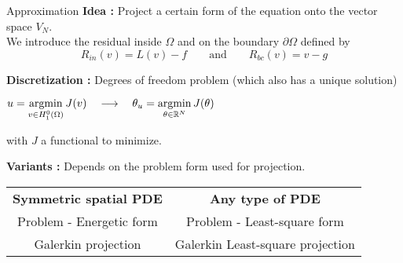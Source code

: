 \begin{frame}{Approximation}
	\textbf{Idea :} Project a certain form of the equation onto the vector space $V_N$. \\
	We introduce the residual inside $\Omega$ and on the boundary $\partial\Omega$ defined by
	\begin{equation*}
		R_{in}(v)=L(v) - f \qquad \text{and} \qquad R_{bc}(v)=v-g
	\end{equation*}
	
	\vspace{5pt}
	
	\textbf{Discretization :} Degrees of freedom problem (which also has a unique solution)
	\begin{center}
		$\displaystyle u=\operatorname*{argmin}_{v\in H_1^0(\Omega)} J(v) \quad \longrightarrow \quad \theta_u=\operatorname*{argmin}_{\theta\in \mathbb{R}^N} J(\theta) $
	\end{center}
	with $J$ a functional to minimize.
	
	\vspace{5pt}
	
	\textbf{Variants :} Depends on the problem form used for projection.
	
	\begin{center}
		\begin{tabular}{c|c}
			\textbf{Symmetric spatial PDE} & \textbf{Any type of PDE} \\
			Problem - Energetic form & Problem - Least-square form \\
			Galerkin projection & Galerkin Least-square projection
		\end{tabular}
	\end{center}
\end{frame}

